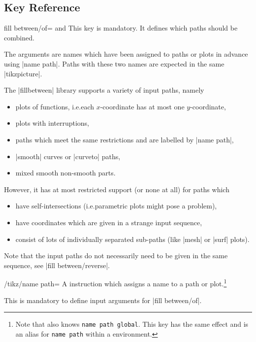\subsection{Key Reference}

\begin{tikzkey}{fill between/of= and }
    This key is mandatory. It defines which paths should be combined.

    The arguments are names which have been assigned to paths or plots in
    advance using |name path|. Paths with these two names are expected in the
    same |tikzpicture|.

    The |fillbetween| library supports a variety of input paths, namely
    \begin{itemize}
        \item plots of functions, i.e.\@ each $x$-coordinate has at most one
            $y$-coordinate,
        \item plots with interruptions,
        \item \Tikz{} paths which meet the same restrictions and are labelled
            by |name path|,
        \item |smooth| curves or |curveto| paths,
        \item mixed smooth non-smooth parts.
    \end{itemize}
    However, it has at most restricted support (or none at all) for paths which
    \begin{itemize}
        \item have self-intersections (i.e.\@ parametric plots might pose a
            problem),
        \item have coordinates which are given in a strange input sequence,
        \item consist of lots of individually separated sub-paths (like
            |mesh| or |surf| plots).
    \end{itemize}

    Note that the input paths do not necessarily need to be given in the same
    sequence, see |fill between/reverse|.
\end{tikzkey}

\begin{key}{/tikz/name path=}
    A \Tikz{} instruction which assigns a name to a path or plot.\footnote{Note
    that \tikzname{} also knows \texttt{name path global}. This key has the
    same effect and is an alias for \texttt{name path} within a \PGFPlots{}
    environment.}

    This is mandatory to define input arguments for |fill between/of|.
\end{key}

